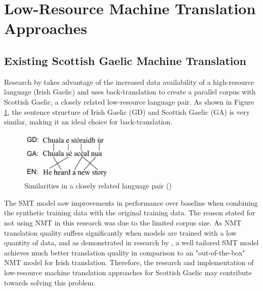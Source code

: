 

\section{Low-Resource Machine Translation Approaches}
\label{LRNMT}


\subsection{Existing Scottish Gaelic Machine Translation}

Research by \cite{dowling_leveraging_2019} takes advantage of the increased data availability of a high-resource language (Irish Gaelic) and uses back-translation to create a parallel corpus with Scottish Gaelic, a closely related low-resource language pair. As shown in Figure \ref{fig:lang_pair}, the sentence structure of Irish Gaelic (GD) and Scottish Gaelic (GA) is very similar, making it an ideal choice for back-translation.

\begin{figure}[ht!]
\centering
\includegraphics[width=0.4\textwidth]{media/literature/nmt_approaches/lr_gaelic.png}
\caption[Diagram of the similarities in a closely related language pair]{Similarities in a closely related language pair (\cite{dowling_leveraging_2019})}
\label{fig:lang_pair}
\end{figure}


The \acrshort{SMT} model saw improvements in performance over baseline when combining the synthetic training data with the original training data. The reason stated for not using \acrshort{NMT} in this research was due to the limited corpus size. As \acrshort{NMT} translation quality suffers significantly when models are trained with a low quantity of data, and as demonstrated in research by \cite{dowling_smt_2018}, a well tailored \acrshort{SMT} model achieves much better translation quality in comparison to an "out-of-the-box" \acrshort{NMT} model for Irish translation. Therefore, the research and implementation of low-resource machine translation approaches for Scottish Gaelic may contribute towards solving this problem.

